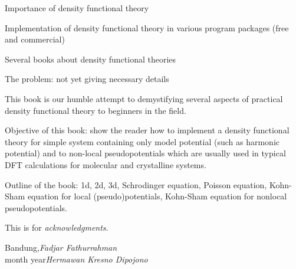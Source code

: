 \preface

Importance of density functional theory

Implementation of density functional theory in various program packages (free and commercial)

Several books about density functional theories

The problem: not yet giving necessary details

This book is our humble attempt to demystifying several aspects of practical density functional
theory to beginners in the field.

Objective of this book: show the reader how to implement a density functional theory
for simple system containing only model potential (such as harmonic potential)
and to non-local pseudopotentials which are usually used in typical DFT calculations
for molecular and crystalline systems.

Outline of the book:
1d, 2d, 3d, Schrodinger equation, Poisson equation, Kohn-Sham equation for local
(pseudo)potentials, Kohn-Sham equation for nonlocal pseudopotentials.

This is for \textit{acknowledgments}.
 
\vspace{\baselineskip}
\begin{flushright}\noindent
Bandung,\hfill {\it Fadjar Fathurrahman}\\
month year\hfill {\it Hermawan Kresno Dipojono}\\
\end{flushright}


